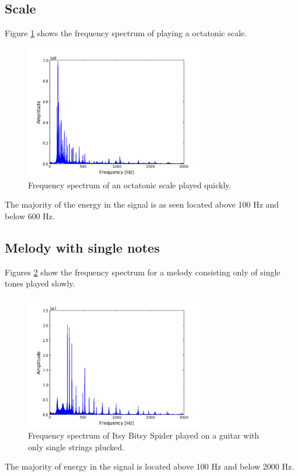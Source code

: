 \subsection{Scale}
Figure \ref{fig:scale_fast} shows the frequency spectrum of playing a octatonic scale.
\begin{figure}[H]
\centering
\includegraphics[width=0.7\textwidth]{figures/freqanal/scale_fast.png}
\caption{Frequency spectrum of an octatonic scale played quickly.}
\label{fig:scale_fast}
\end{figure}
The majority of the energy in the signal is as seen located above 100 Hz and below 600 Hz.

\subsection{Melody with single notes}
Figures \ref{fig:melody_single} show the frequency spectrum for a melody consisting only of single tones played slowly.
\begin{figure}[H]
\centering
\includegraphics[width=0.7\textwidth]{figures/freqanal/melody_single.png}
\caption{Frequency spectrum of Itsy Bitsy Spider played on a guitar with only single strings plucked.}
\label{fig:melody_single}
\end{figure}
The majority of energy in the signal is located above 100 Hz and below 2000 Hz.

